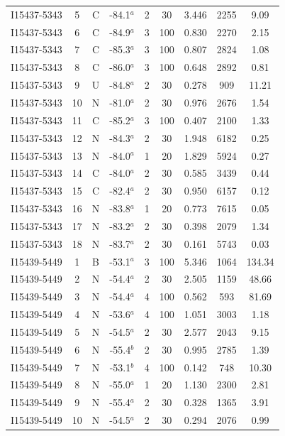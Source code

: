 \begin{table}
\begin{tabular}{ccccccccc}
I15437-5343 & 5 & C & -84.1$^{a}$ & 2 & 30 & 3.446 & 2255 & 9.09 \\
I15437-5343 & 6 & C & -84.9$^{a}$ & 3 & 100 & 0.830 & 2270 & 2.15 \\
I15437-5343 & 7 & C & -85.3$^{a}$ & 3 & 100 & 0.807 & 2824 & 1.08 \\
I15437-5343 & 8 & C & -86.0$^{a}$ & 3 & 100 & 0.648 & 2892 & 0.81 \\
I15437-5343 & 9 & U & -84.8$^{a}$ & 2 & 30 & 0.278 & 909 & 11.21 \\
I15437-5343 & 10 & N & -81.0$^{a}$ & 2 & 30 & 0.976 & 2676 & 1.54 \\
I15437-5343 & 11 & C & -85.2$^{a}$ & 3 & 100 & 0.407 & 2100 & 1.33 \\
I15437-5343 & 12 & N & -84.3$^{a}$ & 2 & 30 & 1.948 & 6182 & 0.25 \\
I15437-5343 & 13 & N & -84.0$^{a}$ & 1 & 20 & 1.829 & 5924 & 0.27 \\
I15437-5343 & 14 & C & -84.0$^{a}$ & 2 & 30 & 0.585 & 3439 & 0.44 \\
I15437-5343 & 15 & C & -82.4$^{a}$ & 2 & 30 & 0.950 & 6157 & 0.12 \\
I15437-5343 & 16 & N & -83.8$^{a}$ & 1 & 20 & 0.773 & 7615 & 0.05 \\
I15437-5343 & 17 & N & -83.2$^{a}$ & 2 & 30 & 0.398 & 2079 & 1.34 \\
I15437-5343 & 18 & N & -83.7$^{a}$ & 2 & 30 & 0.161 & 5743 & 0.03 \\
I15439-5449 & 1 & B & -53.1$^{a}$ & 3 & 100 & 5.346 & 1064 & 134.34 \\
I15439-5449 & 2 & N & -54.4$^{a}$ & 2 & 30 & 2.505 & 1159 & 48.66 \\
I15439-5449 & 3 & N & -54.4$^{a}$ & 4 & 100 & 0.562 & 593 & 81.69 \\
I15439-5449 & 4 & N & -53.6$^{a}$ & 4 & 100 & 1.051 & 3003 & 1.18 \\
I15439-5449 & 5 & N & -54.5$^{a}$ & 2 & 30 & 2.577 & 2043 & 9.15 \\
I15439-5449 & 6 & N & -55.4$^{b}$ & 2 & 30 & 0.995 & 2785 & 1.39 \\
I15439-5449 & 7 & N & -53.1$^{b}$ & 4 & 100 & 0.142 & 748 & 10.30 \\
I15439-5449 & 8 & N & -55.0$^{a}$ & 1 & 20 & 1.130 & 2300 & 2.81 \\
I15439-5449 & 9 & N & -55.4$^{a}$ & 2 & 30 & 0.328 & 1365 & 3.91 \\
I15439-5449 & 10 & N & -54.5$^{a}$ & 2 & 30 & 0.294 & 2076 & 0.99 \\

\end{tabular}
\end{table}
